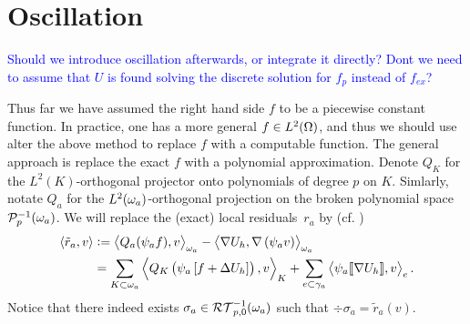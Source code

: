 \documentclass[thesis.tex]{subfiles}
\begin{document}
\section{Oscillation}
\textcolor{blue}{Should we introduce oscillation afterwards, or integrate it directly?
Dont we need to assume that $U$ is found solving the discrete solution for $f_{p}$ instead of $f_{ex}$?}

Thus far we have assumed the right hand side $f$ to be a piecewise constant function. In practice, one 
has a more general $f \in L^2(\Omega)$, and thus we should use alter the above method to replace $f$ with a computable function.
The general approach is replace the exact $f$ with a polynomial approximation. 
Denote $Q_K$ for the $L^2(K)$-orthogonal projector onto polynomials of degree $p$ on $K$.
Simlarly, notate $Q_a$ for the $L^2(\omega_a)$-orthogonal projection on the broken polynomial space $\mathcal{P}_p^{-1}(\omega_a)$.
We will replace the (exact) local residuals~$r_a$ by  (cf. \cite[Thm~3.17]{ernequil})
\begin{align*}
  \left \langle \tilde r_a, v \right \rangle &:= \left \langle Q_a(\psi_af),v \right \rangle_{\omega_a} - \left \langle \nabla U_h, \nabla \left(\psi_a v\right) \right \rangle_{\omega_a} \\
   &= \sum_{K \subset \omega_a} \left \langle Q_K \left(\psi_a \left[f + \Delta U_h\right]\right), v \right \rangle_K 
  +\sum_{e \subset \gamma_a} \left \langle \psi_a \llbracket \nabla U_h\rrbracket, v \right \rangle_e.
\end{align*}
Notice that there indeed exists $\sigma_a \in \mathcal{RT}_{p,0}^{-1}(\omega_a)$ such that $\div \sigma_a = \tilde r_a(v)$.
\end{document}
